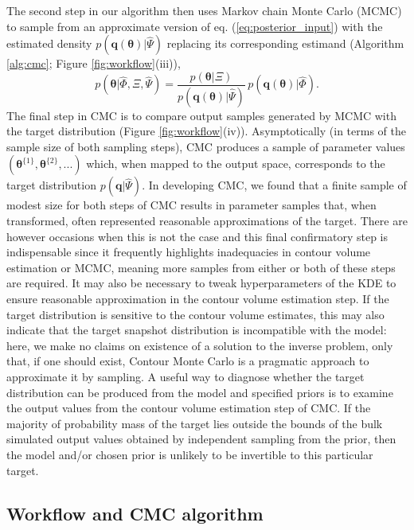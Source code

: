 The second step in our algorithm then uses Markov chain Monte Carlo (MCMC) to sample from an approximate version of eq. (\ref{eq:posterior_input}) with the estimated density $p(\boldsymbol{q}(\boldsymbol{\theta})|\hat{\Psi})$ replacing its corresponding estimand (Algorithm \ref{alg:cmc}; Figure \ref{fig:workflow}(iii)),
%
\begin{equation}\label{eq:posterior_input_estimated}
p(\boldsymbol{\theta}|\hat{\Phi},\Xi,\hat{\Psi}) =
\frac{p(\boldsymbol{\theta}|\Xi)}{p(\boldsymbol{q}(\boldsymbol{\theta})|\hat{\Psi})} \,
p(\boldsymbol{q}(\boldsymbol{\theta})|\hat{\Phi}).
\end{equation}
%
The final step in CMC is to compare output samples generated by MCMC with the target distribution (Figure \ref{fig:workflow}(iv)). Asymptotically (in terms of the sample size of both sampling steps), CMC produces a sample of parameter values $(\boldsymbol{\theta}^{\{1\}},\boldsymbol{\theta}^{\{2\}},...)$ which, when mapped to the output space, corresponds to the target distribution $p(\boldsymbol{q}|\hat{\Psi})$. In developing CMC, we found that a finite sample of modest size for both steps of CMC results in parameter samples that, when transformed, often represented reasonable approximations of the target. There are however occasions when this is not the case and this final confirmatory step is indispensable since it frequently highlights inadequacies in contour volume estimation or MCMC, meaning more samples from either or both of these steps are required. It may also be necessary to tweak hyperparameters of the KDE to ensure reasonable approximation in the contour volume estimation step. If the target distribution is sensitive to the contour volume estimates, this may also indicate that the target snapshot distribution is incompatible with the model: here, we make no claims on existence of a solution to the inverse problem, only that, if one should exist, Contour Monte Carlo is a pragmatic approach to approximate it by sampling. A useful way to diagnose whether the target distribution can be produced from the model and specified priors is to examine the output values from the contour volume estimation step of CMC. If the majority of probability mass of the target lies outside the bounds of the bulk simulated output values obtained by independent sampling from the prior, then the model and/or chosen prior is unlikely to be invertible to this particular target.

\subsection{Workflow and CMC algorithm}

